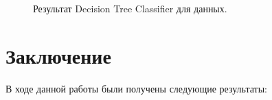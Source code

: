 \documentclass[14pt]{matmex-diploma-custom}
\begin{document}
\begin{figure}
\caption{Результат Decision Tree Classifier для данных.}
\label{report}
\end{figure}


\section*{Заключение}
В ходе данной работы были получены следующие результаты:
\end{document}
